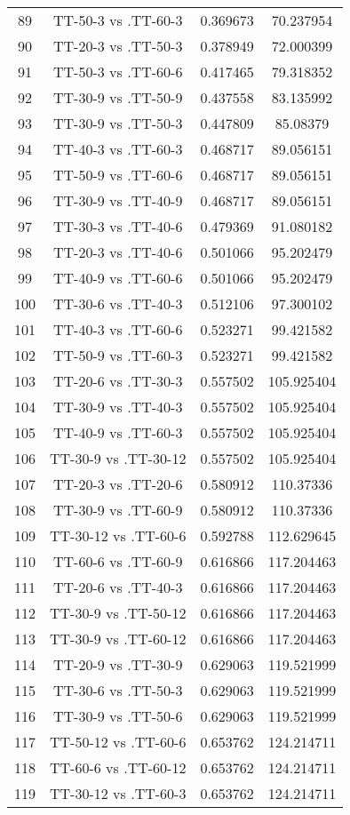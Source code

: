 \documentclass[a4paper,10pt]{article}
\begin{document}
\begin{landscape}
\begin{table}[!htp]
\begin{tabular}{cccc}
89&TT-50-3 vs .TT-60-3&0.369673&70.237954\\
90&TT-20-3 vs .TT-50-3&0.378949&72.000399\\
91&TT-50-3 vs .TT-60-6&0.417465&79.318352\\
92&TT-30-9 vs .TT-50-9&0.437558&83.135992\\
93&TT-30-9 vs .TT-50-3&0.447809&85.08379\\
94&TT-40-3 vs .TT-60-3&0.468717&89.056151\\
95&TT-50-9 vs .TT-60-6&0.468717&89.056151\\
96&TT-30-9 vs .TT-40-9&0.468717&89.056151\\
97&TT-30-3 vs .TT-40-6&0.479369&91.080182\\
98&TT-20-3 vs .TT-40-6&0.501066&95.202479\\
99&TT-40-9 vs .TT-60-6&0.501066&95.202479\\
100&TT-30-6 vs .TT-40-3&0.512106&97.300102\\
101&TT-40-3 vs .TT-60-6&0.523271&99.421582\\
102&TT-50-9 vs .TT-60-3&0.523271&99.421582\\
103&TT-20-6 vs .TT-30-3&0.557502&105.925404\\
104&TT-30-9 vs .TT-40-3&0.557502&105.925404\\
105&TT-40-9 vs .TT-60-3&0.557502&105.925404\\
106&TT-30-9 vs .TT-30-12&0.557502&105.925404\\
107&TT-20-3 vs .TT-20-6&0.580912&110.37336\\
108&TT-30-9 vs .TT-60-9&0.580912&110.37336\\
109&TT-30-12 vs .TT-60-6&0.592788&112.629645\\
110&TT-60-6 vs .TT-60-9&0.616866&117.204463\\
111&TT-20-6 vs .TT-40-3&0.616866&117.204463\\
112&TT-30-9 vs .TT-50-12&0.616866&117.204463\\
113&TT-30-9 vs .TT-60-12&0.616866&117.204463\\
114&TT-20-9 vs .TT-30-9&0.629063&119.521999\\
115&TT-30-6 vs .TT-50-3&0.629063&119.521999\\
116&TT-30-9 vs .TT-50-6&0.629063&119.521999\\
117&TT-50-12 vs .TT-60-6&0.653762&124.214711\\
118&TT-60-6 vs .TT-60-12&0.653762&124.214711\\
119&TT-30-12 vs .TT-60-3&0.653762&124.214711\\

\end{tabular}
\end{table}
\end{landscape}
\end{document}
